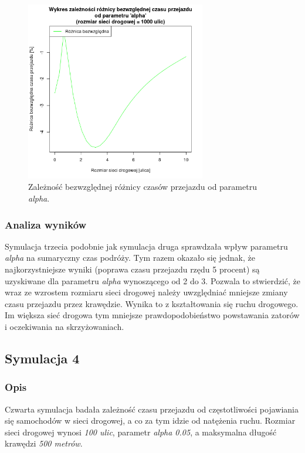 \documentclass[11pt,a4paper]{article}
\begin{document}
\begin{figure}[H]
	\centering
		\includegraphics[width=0.7\textwidth]{../images/simulation3_diff}
	\caption{Zależność bezwzględnej różnicy czasów przejazdu od parametru \textit{alpha}.}
\end{figure}

\subsubsection{Analiza wyników}

Symulacja trzecia podobnie jak symulacja druga sprawdzała wpływ parametru \textit{alpha} na sumaryczny czas podróży. Tym razem okazało się jednak, że najkorzystniejsze wyniki (poprawa czasu przejazdu rzędu 5 procent) są uzyskiwane dla parametru \textit{alpha} wynoszącego od 2 do 3. Pozwala to stwierdzić, że wraz ze wzrostem rozmiaru sieci drogowej należy uwzględniać mniejsze zmiany czasu przejazdu przez krawędzie. Wynika to z kształtowania się ruchu drogowego. Im większa sieć drogowa tym mniejsze prawdopodobieństwo powstawania zatorów i oczekiwania na skrzyżowaniach.

\subsection{Symulacja 4}

\subsubsection{Opis}

Czwarta symulacja badała zależność czasu przejazdu od częstotliwości pojawiania się samochodów w sieci drogowej, a co za tym idzie od natężenia ruchu. Rozmiar sieci drogowej wynosi \textit{100 ulic}, parametr \textit{alpha 0.05}, a maksymalna długość krawędzi \textit{500 metrów}.
\end{document}
